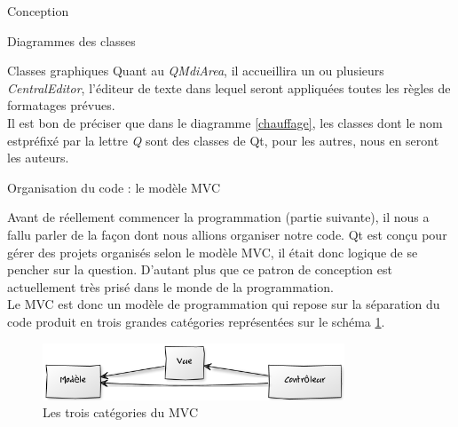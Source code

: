 \documentclass[a4paper, 12pt]{report}
\begin{document}
\begin{part}{Conception}
\begin{chapter}{Diagrammes des classes}
\begin{section}{Classes graphiques}
				Quant au \emph{QMdiArea}, il accueillira un ou plusieurs \emph{CentralEditor}, l'éditeur de texte dans lequel seront appliquées
				toutes les règles de formatages prévues.\\

				Il est bon de préciser que dans le diagramme \ref{chauffage}, les classes dont le nom estpréfixé par la lettre \emph{Q}
				sont des classes de \gls{Qt}, pour les autres, nous en seront les auteurs.
			\end{section}
		\end{chapter}
		\begin{chapter}{Organisation du code : le modèle MVC}

			Avant de réellement commencer la programmation (partie suivante), il nous a fallu parler de la façon dont nous allions organiser
			notre code. \gls{Qt} est conçu pour gérer des projets organisés selon le modèle \gls{MVC}, il était donc logique de se pencher
			sur la question. D'autant plus que ce patron de conception est actuellement très prisé dans le monde de la programmation.\\


			Le \gls{MVC} est donc un modèle de programmation qui repose sur la séparation du code produit en trois grandes catégories
			représentées sur le schéma \ref{sinistre}.\\
			\begin{figure}[ht]
					\begin{center}
						\includegraphics[width=9cm]{images/mvc.png}
						\caption{Les trois catégories du MVC}
						\label{sinistre}
					\end{center}
				\end{figure}~\\



\end{chapter}
\end{part}
\end{document}
